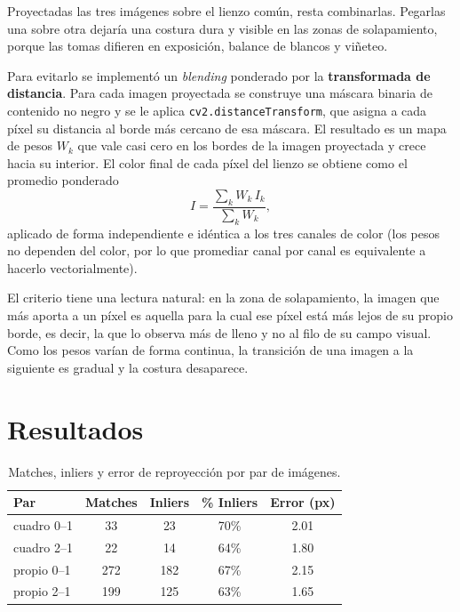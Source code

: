 \documentclass[conference]{IEEEtran}
\begin{document}
Proyectadas las tres imágenes sobre el lienzo común, resta combinarlas. Pegarlas una sobre otra dejaría una costura dura y visible en las zonas de solapamiento, porque las tomas difieren en exposición, balance de blancos y viñeteo.

Para evitarlo se implementó un \textit{blending} ponderado por la \textbf{transformada de distancia}. Para cada imagen proyectada se construye una máscara binaria de contenido no negro y se le aplica \texttt{cv2.distanceTransform}, que asigna a cada píxel su distancia al borde más cercano de esa máscara. El resultado es un mapa de pesos $W_k$ que vale casi cero en los bordes de la imagen proyectada y crece hacia su interior. El color final de cada píxel del lienzo se obtiene como el promedio ponderado
\begin{equation}
I = \frac{\sum_k W_k \, I_k}{\sum_k W_k},
\end{equation}
aplicado de forma independiente e idéntica a los tres canales de color (los pesos no dependen del color, por lo que promediar canal por canal es equivalente a hacerlo vectorialmente).

El criterio tiene una lectura natural: en la zona de solapamiento, la imagen que más aporta a un píxel es aquella para la cual ese píxel está más lejos de su propio borde, es decir, la que lo observa más de lleno y no al filo de su campo visual. Como los pesos varían de forma continua, la transición de una imagen a la siguiente es gradual y la costura desaparece.

\section{Resultados}
\label{sec:resultados}

\begin{table}[htbp]
\caption{Matches, inliers y error de reproyección por par de imágenes.}
\begin{center}
\begin{tabular}{l c c c c}
\hline
\textbf{Par} & \textbf{Matches} & \textbf{Inliers} & \textbf{\% Inliers} & \textbf{Error (px)} \\
\hline
cuadro 0--1 & 33 & 23 & 70\% & 2.01 \\
cuadro 2--1 & 22 & 14 & 64\% & 1.80 \\
propio 0--1 & 272 & 182 & 67\% & 2.15 \\
propio 2--1 & 199 & 125 & 63\% & 1.65 \\
\hline
\end{tabular}
\label{tab:resultados}
\end{center}
\end{table}
\end{document}
